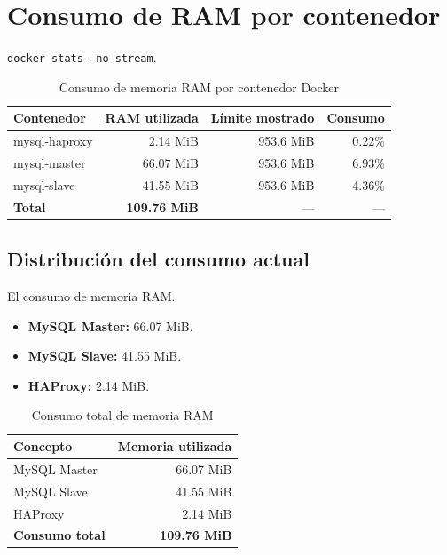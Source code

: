 \documentclass[10pt,a4paper]{article}
\begin{document}
\section{Consumo de RAM por contenedor}

\texttt{docker stats --no-stream}.

\begin{table}[htbp]
    \centering
    \caption{Consumo de memoria RAM por contenedor Docker}
    \label{tab:ram_contenedores}
    \begin{tabular}{lrrr}
        \toprule
        \textbf{Contenedor} &
        \textbf{RAM utilizada} &
        \textbf{Límite mostrado} &
        \textbf{Consumo} \\
        \midrule
        mysql-haproxy & 2.14 MiB  & 953.6 MiB & 0.22\% \\
        mysql-master  & 66.07 MiB & 953.6 MiB & 6.93\% \\
        mysql-slave   & 41.55 MiB & 953.6 MiB & 4.36\% \\
        \midrule
        \textbf{Total} & \textbf{109.76 MiB} & --- & --- \\
        \bottomrule
    \end{tabular}
\end{table}

\subsection{Distribución del consumo actual}

El consumo de memoria RAM.

\begin{itemize}
    \item \textbf{MySQL Master:} 66.07 MiB.
    \item \textbf{MySQL Slave:} 41.55 MiB.
    \item \textbf{HAProxy:} 2.14 MiB.
\end{itemize}

\begin{table}[htbp]
    \centering
    \caption{Consumo total de memoria RAM}
    \label{tab:ram_total}
    \begin{tabular}{lr}
        \toprule
        \textbf{Concepto} & \textbf{Memoria utilizada} \\
        \midrule
        MySQL Master & 66.07 MiB \\
        MySQL Slave  & 41.55 MiB \\
        HAProxy      & 2.14 MiB \\
        \midrule
        \textbf{Consumo total} & \textbf{109.76 MiB} \\
        \bottomrule
    \end{tabular}
\end{table}
\end{document}
